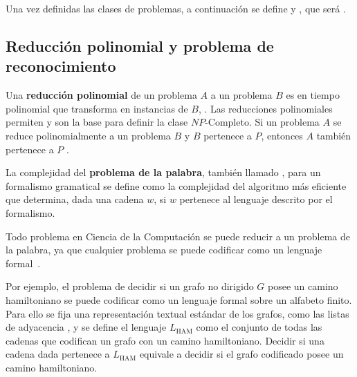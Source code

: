 \documentclass{report}
\theoremstyle{definition}
\theoremstyle{plain}
\theoremstyle{remark}
\begin{document}
Una vez definidas las clases de problemas, a continuación se define  y , que será .

\subsection{Reducción polinomial y problema de reconocimiento}

Una \textbf{reducción polinomial} de un problema $A$ a un problema $B$ es  en tiempo polinomial que transforma  en instancias de $B$, . Las reducciones polinomiales permiten  y son la base para definir la clase $NP$-Completo. Si un problema $A$ se reduce polinomialmente a un problema $B$ y $B$ pertenece a $P$, entonces $A$ también pertenece a $P$ \agregaesto{[REF]}.

La complejidad del \textbf{problema de la palabra}, también llamado , para un formalismo gramatical se define como la complejidad del algoritmo más eficiente que determina, dada una cadena $w$, si $w$ pertenece al lenguaje descrito por el formalismo.

Todo problema en Ciencia de la Computación se puede reducir a un problema de la palabra, ya que cualquier problema se puede codificar como un lenguaje formal~\cite{hopcroft2006introduction}. 

Por ejemplo, el problema de decidir si un grafo no dirigido $G$ posee un camino hamiltoniano se puede codificar como un lenguaje formal sobre un alfabeto finito. Para ello se fija una representación textual estándar de los grafos, como las listas de adyacencia , y se define el lenguaje $L_{\mathrm{HAM}}$ como el conjunto de todas las cadenas que codifican un grafo con un camino hamiltoniano.  Decidir si una cadena dada pertenece a $L_{\mathrm{HAM}}$ equivale a decidir si el grafo codificado posee un camino hamiltoniano. 
\end{document}
